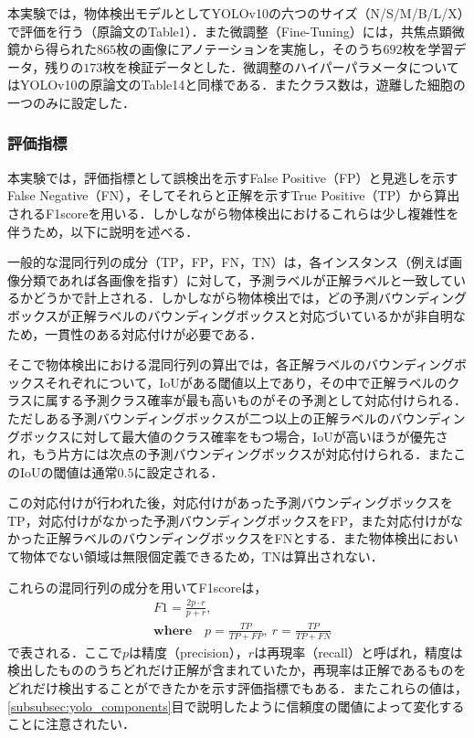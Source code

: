     本実験では，物体検出モデルとしてYOLOv10の六つのサイズ（N/S/M/B/L/X）で評価を行う（原論文\cite{wang2024yolov10}のTable1）．また微調整（Fine-Tuning）には，共焦点顕微鏡から得られた$865$枚の画像にアノテーションを実施し，そのうち$692$枚を学習データ，残りの$173$枚を検証データとした．微調整のハイパーパラメータについてはYOLOv10の原論文\cite{wang2024yolov10}のTable14と同様である．またクラス数は，遊離した細胞の一つのみに設定した．

    \subsubsection{評価指標}

    本実験では，評価指標として誤検出を示すFalse Positive（FP）と見逃しを示すFalse Negative（FN），そしてそれらと正解を示すTrue Positive（TP）から算出されるF1scoreを用いる．しかしながら物体検出におけるこれらは少し複雑性を伴うため，以下に説明を述べる．

    一般的な混同行列の成分（TP，FP，FN，TN）は，各インスタンス（例えば画像分類であれば各画像を指す）に対して，予測ラベルが正解ラベルと一致しているかどうかで計上される．しかしながら物体検出では，どの予測バウンディングボックスが正解ラベルのバウンディングボックスと対応づいているかが非自明なため，一貫性のある対応付けが必要である．

    そこで物体検出における混同行列の算出では，各正解ラベルのバウンディングボックスそれぞれについて，IoUがある閾値以上であり，その中で正解ラベルのクラスに属する予測クラス確率が最も高いものがその予測として対応付けられる．ただしある予測バウンディングボックスが二つ以上の正解ラベルのバウンディングボックスに対して最大値のクラス確率をもつ場合，IoUが高いほうが優先され，もう片方には次点の予測バウンディングボックスが対応付けられる．またこのIoUの閾値は通常$0.5$に設定される．

    この対応付けが行われた後，対応付けがあった予測バウンディングボックスをTP，対応付けがなかった予測バウンディングボックスをFP，また対応付けがなかった正解ラベルのバウンディングボックスをFNとする．また物体検出において物体でない領域は無限個定義できるため，TNは算出されない．

    これらの混同行列の成分を用いてF1scoreは，
    \begin{equation}
        \label{eq:f1_score}
        \begin{aligned}
            &F1 = \frac{2 p\cdot r}{p + r},
            \\ &\textbf{where} \quad p = \frac{TP}{TP + FP}, ~ r = \frac{TP}{TP + FN}
        \end{aligned}
    \end{equation}
    で表される．ここで$p$は精度（precision），$r$は再現率（recall）と呼ばれ，精度は検出したもののうちどれだけ正解が含まれていたか，再現率は正解であるものをどれだけ検出することができたかを示す評価指標でもある．またこれらの値は，\ref{subsubsec:yolo_components}目で説明したように信頼度の閾値によって変化することに注意されたい．

